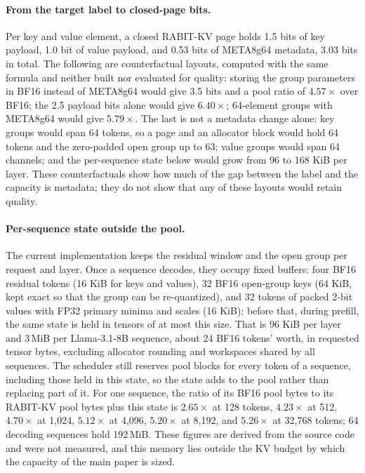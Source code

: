\documentclass{article}
\begin{document}
\paragraph{From the target label to closed-page bits.}
Per key and value element, a closed RABIT-KV page holds 1.5 bits of key payload, 1.0 bit of value
payload, and 0.53 bits of META8g64 metadata, 3.03 bits in total. The following are counterfactual
layouts, computed with the same formula and neither built nor evaluated for quality: storing the
group parameters in BF16 instead of META8g64 would give 3.5 bits and a pool ratio of $4.57\times$ over
BF16; the 2.5 payload bits alone would give $6.40\times$; 64-element groups with META8g64 would give
$5.79\times$. The last is not a metadata change alone: key groups would span 64 tokens, so a page and
an allocator block would hold 64 tokens and the zero-padded open group up to 63; value groups would
span 64 channels; and the per-sequence state below would grow from 96 to 168 KiB per layer. These
counterfactuals show how much of the gap between the label and the capacity is metadata; they do not
show that any of these layouts would retain quality.

\paragraph{Per-sequence state outside the pool.}
The current implementation keeps the residual window and the open group per request and layer. Once a
sequence decodes, they occupy fixed buffers: four BF16 residual tokens (16 KiB for keys and values),
32 BF16 open-group keys (64 KiB, kept exact so that the group can be re-quantized), and 32 tokens of
packed 2-bit values with FP32 primary minima and scales (16 KiB); before that, during prefill, the same
state is held in tensors of at most this size. That is 96 KiB per layer and 3\,MiB per Llama-3.1-8B
sequence, about 24 BF16 tokens' worth, in requested tensor bytes, excluding allocator rounding and
workspaces shared by all sequences. The scheduler still reserves pool blocks for every token of a
sequence, including those held in this state, so the state adds to the pool rather than replacing part
of it. For one sequence, the ratio of its BF16 pool bytes to its RABIT-KV pool bytes plus this state is
$2.65\times$ at 128 tokens, $4.23\times$ at 512, $4.70\times$ at 1,024, $5.12\times$ at 4,096,
$5.20\times$ at 8,192, and $5.26\times$ at 32,768 tokens; 64 decoding sequences hold 192\,MiB. These
figures are derived from the source code and were not measured, and this memory lies outside the KV
budget by which the capacity of the main paper is sized.
\end{document}
